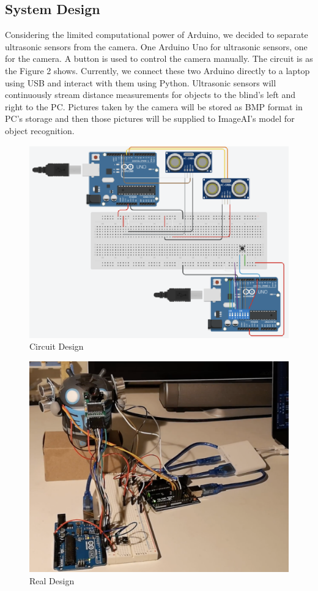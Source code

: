 \subsection{System Design}
Considering the limited computational power of Arduino, we decided to separate ultrasonic sensors from the camera. 
One Arduino Uno for ultrasonic sensors, one for the camera. A button is used to control the camera manually. 
The circuit is as the Figure 2 shows. Currently, we connect these two Arduino directly to a laptop using USB and interact with them using Python. 
\newline \newline
Ultrasonic sensors will continuously stream distance measurements for objects to the blind’s left and right to the PC. 
Pictures taken by the camera will be stored as BMP format in PC’s storage and then those pictures will be supplied to ImageAI’s model for object recognition. 

\begin{figure}
  \includegraphics{circuit}
  \caption{Circuit Design}
\end{figure}

\begin{figure}
  \includegraphics{real-design}
  \caption{Real Design}
\end{figure}

